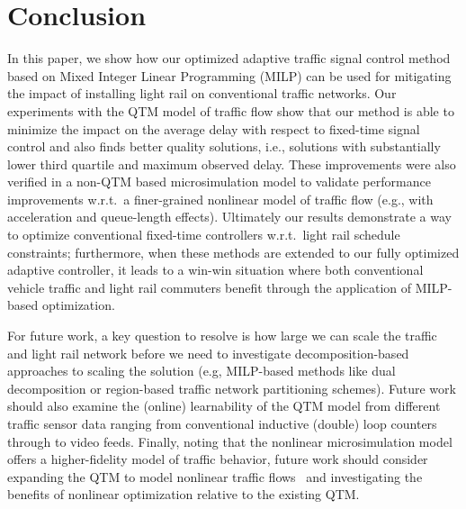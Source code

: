 \section{Conclusion}

In this paper, we show how our optimized adaptive traffic signal
control method based on Mixed Integer Linear Programming (MILP) can be
used for mitigating the impact of installing light rail on
conventional traffic networks.  Our experiments with the QTM model of
traffic flow show that our method is able to minimize the impact on
the average delay with respect to fixed-time signal control and also
finds better quality solutions, i.e., solutions with substantially
lower third quartile and maximum observed delay.  These improvements
were also verified in a non-QTM based microsimulation model to
validate performance improvements w.r.t.\ a finer-grained nonlinear
model of traffic flow (e.g., with acceleration and queue-length
effects).
%
%
Ultimately our results demonstrate a way to optimize conventional
fixed-time controllers w.r.t.\ light rail schedule constraints;
furthermore, when these methods are extended to our fully optimized
adaptive controller, it leads to a win-win situation where both
conventional vehicle traffic and light rail commuters benefit through
the application of MILP-based optimization.
%
%

For future work, a key question to resolve is how large we can scale
the traffic and light rail network before we need to investigate
decomposition-based approaches to scaling the solution 
(e.g, 
MILP-based methods like dual decomposition or region-based
traffic network partitioning schemes).
Future
work should also examine the (online) learnability of the QTM model
from different traffic sensor data ranging from conventional inductive
(double) loop counters through to video feeds.  Finally, noting that
the nonlinear microsimulation model offers a higher-fidelity model of 
traffic behavior, future work should consider expanding the QTM to
model nonlinear traffic
flows~\cite{lu2011discrete,muralidharan2009freeway,kim2002online,huang2011traffic}
and investigating the benefits of nonlinear optimization 
relative to the existing QTM.

